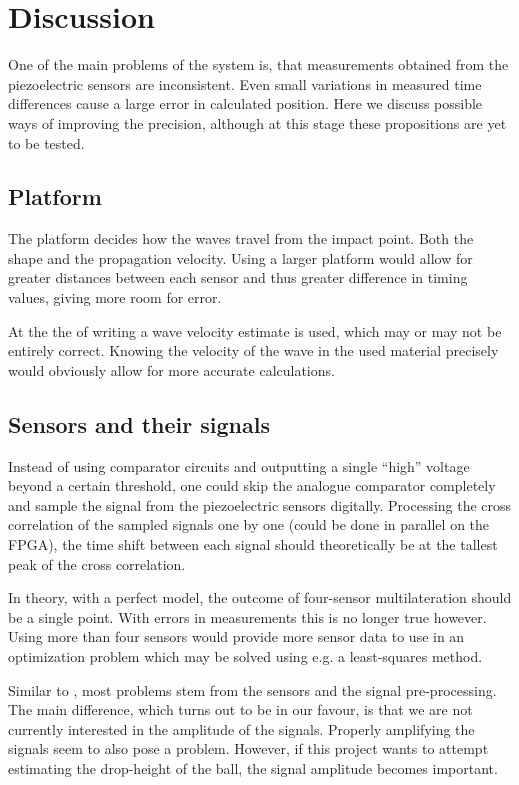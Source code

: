 \chapter{Discussion}
\label{chap:discussion}

One of the main problems of the system is, that measurements obtained from the piezoelectric sensors are inconsistent.
Even small variations in measured time differences cause a large error in calculated position.
Here we discuss possible ways of improving the precision, although at this stage these propositions are yet to be tested.

\section{Platform}
The platform decides how the waves travel from the impact point. Both the shape and the propagation velocity.
Using a larger platform would allow for greater distances between each sensor and thus greater difference in timing values, giving more room for error.

At the the of writing a wave velocity estimate is used, which may or may not be entirely correct.
Knowing the velocity of the wave in the used material precisely would obviously allow for more accurate calculations.

\section{Sensors and their signals}
Instead of using comparator circuits and outputting a single ``high'' voltage beyond a certain threshold, one could skip the analogue comparator completely and sample the signal from the piezoelectric sensors digitally.
Processing the cross correlation of the sampled signals one by one (could be done in parallel on the FPGA), the time shift between each signal should theoretically be at the tallest peak of the cross correlation.

In theory, with a perfect model, the outcome of four-sensor multilateration should be a single point. With errors in measurements this is no longer true however. Using more than four sensors would provide more sensor data to use in an optimization problem which may be solved using e.g. a least-squares method.

Similar to \cite{anon09}, most problems stem from the sensors and the signal pre-processing.
The main difference, which turns out to be in our favour, is that we are not currently interested in the amplitude of the signals.
Properly amplifying the signals seem to also pose a problem.
However, if this project wants to attempt estimating the drop-height of the ball, the signal amplitude becomes important.


